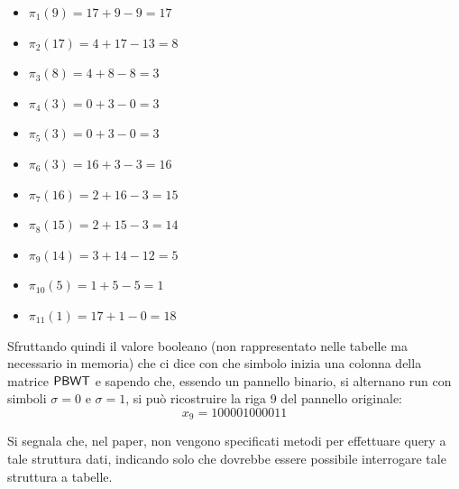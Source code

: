 \begin{esempio}
\begin{multicols}{2}
\begin{itemize}
      \item $\pi_1(9)=17+9-9=17$
      \item $\pi_2(17)=4+17-13=8$
      \item $\pi_3(8)=4+8-8=3$
      \item $\pi_4(3)=0+3-0=3$
      \item $\pi_5(3)=0+3-0=3$
      \item $\pi_6(3)=16+3-3=16$
      \item $\pi_7(16)=2+16-3=15$
      \item $\pi_8(15)=2+15-3=14$
      \item $\pi_9(14)=3+14-12=5$
      \item $\pi_{10}(5)=1+5-5=1$
      \item $\pi_{11}(1)=17+1-0=18$
    \end{itemize}
  \end{multicols}
  Sfruttando quindi il valore booleano (non rappresentato nelle tabelle ma
  necessario in memoria) che ci dice con che simbolo inizia una colonna
  della matrice $\mbox{\rm {\sf PBWT}}$ e
  sapendo che, 
  essendo un pannello binario, si alternano run con simboli $\sigma=0$ e
  $\sigma=1$, si può ricostruire la riga 9 del pannello originale:
  \[x_9=100001000011\]
\end{esempio}
Si segnala che, nel paper, non vengono specificati metodi per
effettuare query a 
tale struttura dati, indicando solo che dovrebbe essere possibile interrogare
tale struttura a tabelle.
